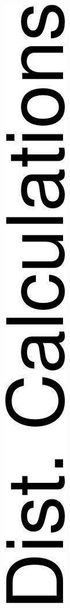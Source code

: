 \begin{figure}[htp]
	\begin{subfigure}{0.018\columnwidth}
			\centering
			\captionsetup{justification=centering}	
			\includegraphics[width=\textwidth]{img/Experiments/EP/dc.png}

\end{subfigure}
\end{figure}
